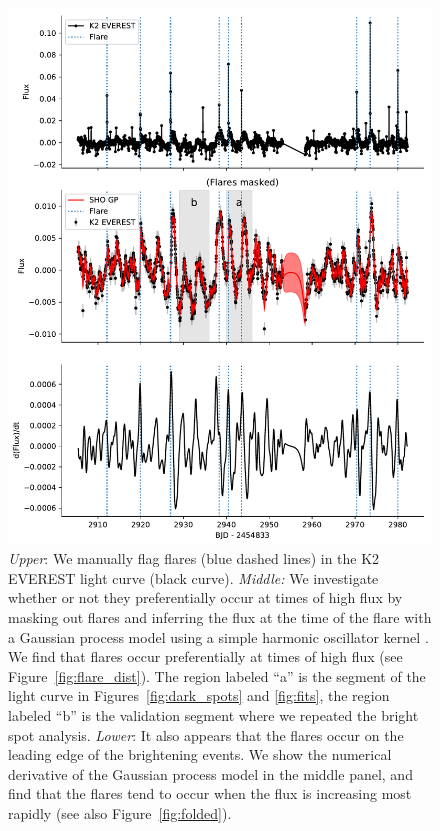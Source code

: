 \begin{figure}
\begin{center}
\includegraphics[scale=0.45]{trappist1_bright/flare_gp_model.pdf}
\end{center}
\caption{\textsl{Upper}: We manually flag flares (blue dashed lines) in the K2 EVEREST light curve (black curve). \textsl{Middle:} We investigate whether or not they preferentially occur at times of high flux by masking out flares and inferring the flux at the time of the flare with a Gaussian process model using a simple harmonic oscillator kernel \citep{Foreman-Mackey2017}. We find that flares occur preferentially at times of high flux (see Figure~\ref{fig:flare_dist}). The region labeled ``a'' is the segment of the light curve in Figures~\ref{fig:dark_spots} and \ref{fig:fits}, the region labeled ``b'' is the validation segment where we repeated the bright spot analysis. \textsl{Lower}: It also appears that the flares occur on the leading edge of the brightening events. We show the numerical derivative of the Gaussian process model in the middle panel, and find that the flares tend to occur when the flux is increasing most rapidly (see also Figure~\ref{fig:folded}). \label{fig:flare_analysis}}
\end{figure}

